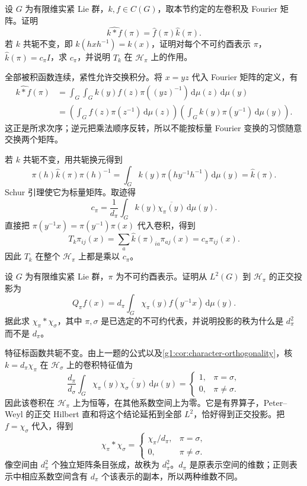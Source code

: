 \begin{exercise}\label{g1:ex:convolution-fourier-order}
	设 \(G\) 为有限维实紧 Lie 群，\(k,f\in C(G)\)，取本节约定的左卷积及 Fourier 矩阵。证明
	\[
		\widehat{k*f}(\pi)=\widehat f(\pi)\widehat k(\pi).
	\]
	若 \(k\) 共轭不变，即 \(k(hxh^{-1})=k(x)\)，证明对每个不可约酉表示 \(\pi\)，\(\widehat k(\pi)=c_\pi I\)，求 \(c_\pi\)，并说明 \(T_k\) 在 \(\mathcal H_\pi\) 上的作用。
\end{exercise}
\begin{solution}
	全部被积函数连续，紧性允许交换积分。将 \(x=yz\) 代入 Fourier 矩阵的定义，有
	\[
		\begin{aligned}
		\widehat{k*f}(\pi)
		&=\int_G\int_Gk(y)f(z)\pi((yz)^{-1})\,
		\mathrm{d}\mu(z)\,\mathrm{d}\mu(y)\\
		&=\left(\int_Gf(z)\pi(z^{-1})\,\mathrm{d}\mu(z)\right)
		\left(\int_Gk(y)\pi(y^{-1})\,\mathrm{d}\mu(y)\right).
		\end{aligned}
	\]
	这正是所求次序；逆元把乘法顺序反转，所以不能按标量 Fourier 变换的习惯随意交换两个矩阵。

	若 \(k\) 共轭不变，用共轭换元得到
	\[
		\pi(h)\widehat k(\pi)\pi(h)^{-1}
		=\int_Gk(y)\pi(hy^{-1}h^{-1})\,\mathrm{d}\mu(y)
		=\widehat k(\pi).
	\]
	Schur 引理使它为标量矩阵。取迹得
	\[
		c_\pi=\frac1{d_\pi}\int_Gk(y)\overline{\chi_\pi(y)}\,\mathrm{d}\mu(y).
	\]
	直接把 \(\pi(y^{-1}x)=\pi(y^{-1})\pi(x)\) 代入卷积，得到
	\[
		T_k\pi_{ij}(x)
		=\sum_a\widehat k(\pi)_{ia}\pi_{aj}(x)=c_\pi\pi_{ij}(x).
	\]
	因此 \(T_k\) 在整个 \(\mathcal H_\pi\) 上都是乘以 \(c_\pi\)。
\end{solution}

\begin{exercise}\label{g1:ex:character-convolution-projection}
	设 \(G\) 为有限维实紧 Lie 群，\(\pi\) 为不可约酉表示。证明从 \(L^2(G)\) 到 \(\mathcal H_\pi\) 的正交投影为
	\[
		Q_\pi f(x)=d_\pi\int_G\chi_\pi(y)f(y^{-1}x)\,\mathrm{d}\mu(y).
	\]
	据此求 \(\chi_\pi*\chi_\sigma\)，其中 \(\pi,\sigma\) 是已选定的不可约代表，并说明投影的秩为什么是 \(d_\pi^2\) 而不是 \(d_\pi\)。
\end{exercise}
\begin{solution}
	特征标函数共轭不变。由上一题的公式以及\cref{g1:cor:character-orthogonality}，核 \(k=d_\pi\chi_\pi\) 在 \(\mathcal H_\sigma\) 上的卷积特征值为
	\[
		\frac{d_\pi}{d_\sigma}
		\int_G\chi_\pi(y)\overline{\chi_\sigma(y)}\,\mathrm{d}\mu(y)
		=\begin{cases}1,&\pi=\sigma,\\0,&\pi\ne\sigma.\end{cases}
	\]
	因此该卷积在 \(\mathcal H_\pi\) 上为恒等，在其他系数空间上为零。它是有界算子，Peter--Weyl 的正交 Hilbert 直和将这个结论延拓到全部 \(L^2\)，恰好得到正交投影。把 \(f=\chi_\sigma\) 代入，得到
	\[
		\chi_\pi*\chi_\sigma
		=\begin{cases}\chi_\pi/d_\pi,&\pi=\sigma,\\0,&\pi\ne\sigma.\end{cases}
	\]
	像空间由 \(d_\pi^2\) 个独立矩阵条目张成，故秩为 \(d_\pi^2\)。\(d_\pi\) 是原表示空间的维数；正则表示中相应系数空间含有 \(d_\pi\) 个该表示的副本，所以两种维数不同。
\end{solution}

